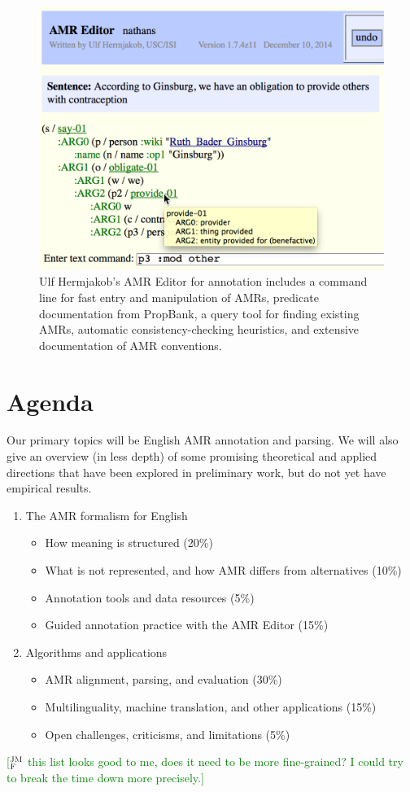 \documentclass[11pt,letterpaper]{article}
\newcommand{\ensuretext}[1]{#1}
\newcommand{\jmfmarker}{\ensuretext{\textcolor{green}{\ensuremath{^{\textsc{JM}}_{\textsc{F}}}}}}
\newcommand{\arkcomment}[3]{\ensuretext{\textcolor{#3}{[#1 #2]}}}
\newcommand{\jmf}[1]{\arkcomment{\jmfmarker}{#1}{green}}
\begin{document}
\begin{figure}\centering
\includegraphics[width=\columnwidth]{editor_zoomed.png}
\caption{Ulf Hermjakob's AMR Editor for annotation includes a command line for fast entry and manipulation of AMRs, 
predicate documentation from PropBank, a query tool for finding existing AMRs, automatic consistency-checking heuristics, 
and extensive documentation of AMR conventions.}
\label{fig:editor}
\end{figure}

\section{Agenda}

Our primary topics will be English AMR annotation and parsing. 
We will also give an overview (in less depth) of some promising theoretical and applied directions 
that have been explored in preliminary work, but do not yet have empirical results.

\begin{enumerate}
\item The AMR formalism for English \begin{itemize}
	\item How meaning is structured (20\%)
	\item What is not represented, and how AMR differs from alternatives (10\%)
	\item Annotation tools and data resources (5\%)
	\item Guided annotation practice with the AMR Editor (15\%)
	\end{itemize}
\item Algorithms and applications \begin{itemize}
	\item AMR alignment, parsing, and evaluation (30\%)
	\item Multilinguality, machine translation, and other applications (15\%)
	\item Open challenges, criticisms, and limitations (5\%)
	\end{itemize}
\end{enumerate}
\jmf{this list looks good to me, does it need to be more fine-grained? I could try to break the time down more precisely.}
\end{document}
